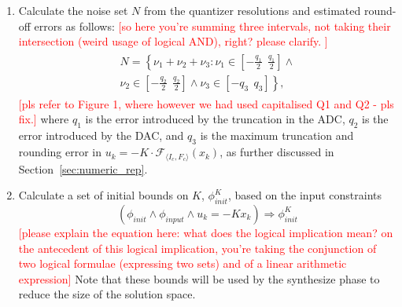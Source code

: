\documentclass[twocolumn]{autart}    %
\newcommand{\mat}[1]{{#1}}
\renewcommand{\note}[1]{\textcolor{red}{[#1]}}
\begin{document}
\begin{enumerate}
\begin{enumerate}

\item Calculate the noise set $N$ from the quantizer resolutions and estimated round-off errors as follows: 
\note{so here you're summing three intervals, not taking their intersection (weird usage of logical AND), right? please clarify. }
\begin{align*}
\nonumber
\begin{split}
N=\left \{ \nu_1+\nu_2+ \nu_3: \nu_1 \in \left[-\frac{q_1}{2}\ \ \frac{q_1}{2}\right] 
\wedge \right. \\ \left. \nu_2 \in \left[-\frac{q_2}{2}\ \ \frac{q_2}{2}\right]  \wedge  \nu_3 \in \left[-q_3\ \ q_3\right]  \right \}, 
\end{split}
\end{align*}
%
\note{pls refer to Figure 1, where however we had used capitalised Q1 and Q2 - pls fix.} 
where  $q_1$ is the error introduced by the truncation in the ADC, 
$q_2$ is the error introduced by the DAC, 
and $q_3$ is the maximum truncation and rounding error in $u_k=-K \cdot \mathcal{F}_{\langle I_c,F_c \rangle}(x_k)$, 
as further discussed in Section~\ref{sec:numeric_rep}. %

\item Calculate a set of initial bounds on $K$, $\phi_\mathit{init}^{K}$,
based on the input constraints %
%
$$(\phi_\mathit{init} \wedge \phi_\mathit{input} \wedge u_k=-K x_k)\Rightarrow \phi_\mathit{init}^{K}
$$
\note{please explain the equation here: 
what does the logical implication mean? 
on the antecedent of this logical implication, you're taking the conjunction of two logical formulae (expressing two sets) and of a linear arithmetic expression}
Note that these bounds will be used by the {\sc synthesize} phase to reduce the size of the solution space. 


\end{enumerate}
\end{enumerate}
\end{document}

